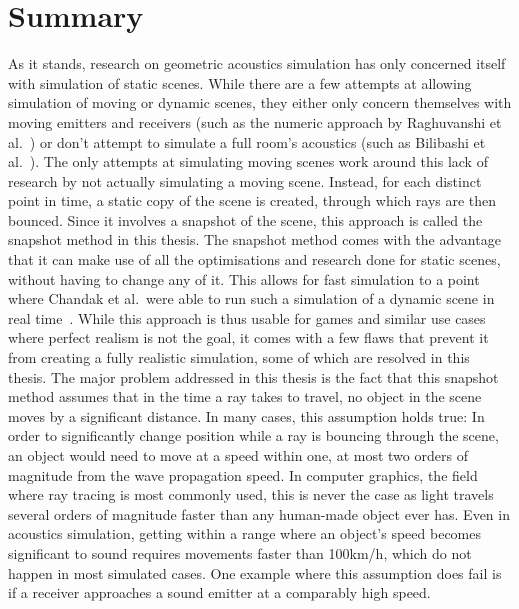 \chapter{Summary}\label{ch:Summary}

As it stands, research on geometric acoustics simulation has only concerned itself with simulation of static scenes.
While there are a few attempts at allowing simulation of moving or dynamic scenes,
they either only concern themselves with moving emitters and receivers
(such as the numeric approach by Raghuvanshi et al.~\cite{RS10})
or don't attempt to simulate a full room's acoustics (such as Bilibashi et al.~\cite{BVD20}).
\newline
The only attempts at simulating moving scenes work around this lack of research by not actually simulating a moving scene.
Instead, for each distinct point in time, a static copy of the scene is created,
through which rays are then bounced.
Since it involves a snapshot of the scene, this approach is called the snapshot method in this thesis.
\newline
The snapshot method comes with the advantage that it can make use of all the optimisations and research done for static scenes,
without having to change any of it.
This allows for fast simulation to a point where Chandak et al.~were able to run such a simulation of a dynamic scene in real time~\cite{Cha08}.
While this approach is thus usable for games and similar use cases where perfect realism is not the goal,
it comes with a few flaws that prevent it from creating a fully realistic simulation,
some of which are resolved in this thesis.
\newline
The major problem addressed in this thesis is the fact that this snapshot method assumes that in the time a ray takes to travel,
no object in the scene moves by a significant distance.
In many cases, this assumption holds true:
In order to significantly change position while a ray is bouncing through the scene,
an object would need to move at a speed within one, at most two orders of magnitude from the wave propagation speed.
In computer graphics, the field where ray tracing is most commonly used,
this is never the case as light travels several orders of magnitude faster than any human-made object ever has.
Even in acoustics simulation, getting within a range where an object's speed becomes significant to sound
requires movements faster than 100km/h, which do not happen in most simulated cases.
\newline
One example where this assumption does fail is if a receiver approaches a sound emitter at a comparably high speed.
